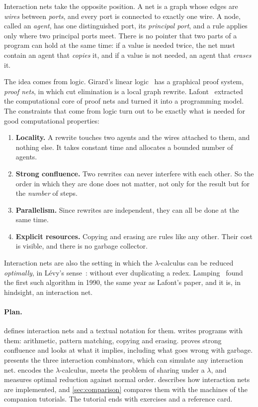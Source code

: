 \documentclass[11pt,a4paper]{article}
\theoremstyle{definition}
\theoremstyle{plain}
\begin{document}
Interaction nets take the opposite position. A net is a graph whose edges are
\emph{wires} between \emph{ports}, and every port is connected to exactly one
wire. A node, called an \emph{agent}, has one distinguished port, its
\emph{principal port}, and a rule applies only where two principal ports meet.
There is no pointer that two parts of a program can hold at the same time: if
a value is needed twice, the net must contain an agent that \emph{copies} it,
and if a value is not needed, an agent that \emph{erases} it.

The idea comes from logic. Girard's linear logic~\cite{girard87} has a
graphical proof system, \emph{proof nets}, in which cut elimination is a local
graph rewrite. Lafont~\cite{lafont90} extracted the computational core of
proof nets and turned it into a programming model. The constraints that come
from logic turn out to be exactly what is needed for good computational
properties:

\begin{enumerate}[itemsep=2pt]
\item \textbf{Locality.} A rewrite touches two agents and the wires attached
  to them, and nothing else. It takes constant time and allocates a bounded
  number of agents.
\item \textbf{Strong confluence.} Two rewrites can never interfere with each
  other. So the order in which they are done does not matter, not only for
  the result but for the \emph{number} of steps.
\item \textbf{Parallelism.} Since rewrites are independent, they can all be
  done at the same time.
\item \textbf{Explicit resources.} Copying and erasing are rules like any
  other. Their cost is visible, and there is no garbage collector.
\end{enumerate}

\noindent
Interaction nets are also the setting in which the $\lambda$-calculus can be
reduced \emph{optimally}, in Lévy's sense~\cite{levy80}: without ever
duplicating a redex. Lamping~\cite{lamping90} found the first such algorithm
in 1990, the same year as Lafont's paper, and it is, in hindsight, an
interaction net.

\paragraph{Plan.}  defines interaction nets and a textual
notation for them.  writes programs with them:
arithmetic, pattern matching, copying and erasing. 
proves strong confluence and looks at what it implies, including what goes
wrong with garbage.  presents the three interaction
combinators, which can simulate any interaction net. 
encodes the $\lambda$-calculus, meets the problem of sharing under a
$\lambda$, and measures optimal reduction against normal order.
 describes how interaction nets are implemented,
and \cref{sec:comparison} compares them with the machines of the companion
tutorials. The tutorial ends with exercises and a reference card.
\end{document}
